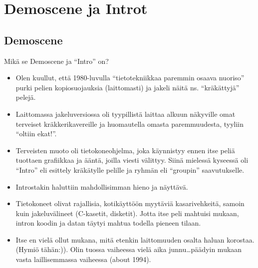 \documentclass[pdf,10pt,handout]{beamer}
\begin{document}
\section{Demoscene ja Introt}
\subsection{Demoscene}
\begin{frame}{Mikä se Demoscene ja ``Intro'' on?}
  \begin{itemize}
  \item Olen kuullut, että 1980-luvulla ``tietotekniikkaa paremmin
    osaava nuoriso'' purki pelien kopiosuojauksia (laittomasti) ja
    jakeli näitä ns. ``kräkättyjä'' pelejä.
  \item Laittomassa jakeluversiossa oli tyypillistä laittaa alkuun
    näkyville omat terveiset kräkkerikavereille ja huomautella omasta
    paremmuudesta, tyyliin ``oltiin ekat!''.
  \item Terveisten muoto oli tietokoneohjelma, joka käynnistyy ennen
    itse peliä tuottaen grafiikkaa ja ääntä, joilla viesti
    välittyy. Siinä mielessä kyseessä oli ``Intro'' eli esittely
    kräkätylle pelille ja ryhmän eli ``groupin'' saavutukselle.
  \item Introstakin haluttiin mahdollisimman hieno ja näyttävä.
  \item Tietokoneet olivat rajallisia, kotikäyttöön myytäviä
    kasarivehkeitä, samoin kuin jakeluvälineet (C-kasetit,
    disketit). Jotta itse peli mahtuisi mukaan, intron koodin
    ja datan täytyi mahtua todella pieneen tilaan.
  \item Itse en vielä ollut mukana, mitä etenkin laittomuuden osalta
    haluan korostaa. (Hymiö tähän:)). Olin tuossa vaiheessa vielä aika
    junnu\ldots päädyin mukaan vasta laillisemmassa vaiheessa (about
    1994).
\end{itemize}
\end{frame}
\end{document}

